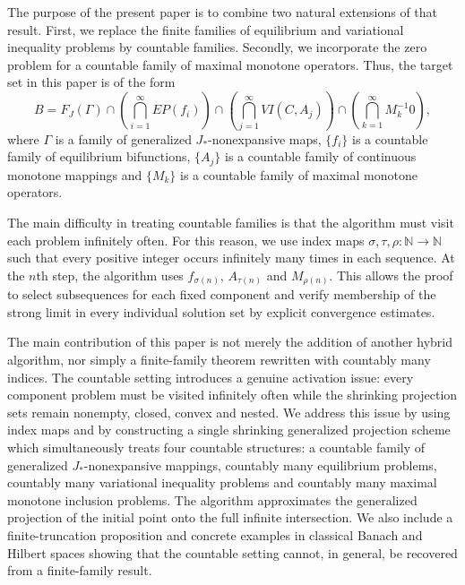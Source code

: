 \documentclass[10pt,a4paper]{amsart}
\numberwithin{equation}{section}
\begin{document}
The purpose of the present paper is to combine two natural extensions of that result. First, we replace the finite families of equilibrium and variational inequality problems by countable families. Secondly, we incorporate the zero problem for a countable family of maximal monotone operators. Thus, the target set in this paper is of the form
\[
B=F_J(\Gamma)\cap\left(\bigcap_{i=1}^{\infty}EP(f_i)\right)
\cap\left(\bigcap_{j=1}^{\infty}VI(C,A_j)\right)
\cap\left(\bigcap_{k=1}^{\infty}M_k^{-1}0\right),
\]
where $\Gamma$ is a family of generalized $J_{*}$-nonexpansive maps, $\{f_i\}$ is a countable family of equilibrium bifunctions, $\{A_j\}$ is a countable family of continuous monotone mappings and $\{M_k\}$ is a countable family of maximal monotone operators.

The main difficulty in treating countable families is that the algorithm must visit each problem infinitely often. For this reason, we use index maps $\sigma,\tau,\rho:\mathbb{N}\to\mathbb{N}$ such that every positive integer occurs infinitely many times in each sequence. At the $n$th step, the algorithm uses $f_{\sigma(n)}$, $A_{\tau(n)}$ and $M_{\rho(n)}$. This allows the proof to select subsequences for each fixed component and verify membership of the strong limit in every individual solution set by explicit convergence estimates.

The main contribution of this paper is not merely the addition of another hybrid algorithm, nor simply a finite-family theorem rewritten with countably many indices. The countable setting introduces a genuine activation issue: every component problem must be visited infinitely often while the shrinking projection sets remain nonempty, closed, convex and nested. We address this issue by using index maps and by constructing a single shrinking generalized projection scheme which simultaneously treats four countable structures: a countable family of generalized $J_{*}$-nonexpansive mappings, countably many equilibrium problems, countably many variational inequality problems and countably many maximal monotone inclusion problems. The algorithm approximates the generalized projection of the initial point onto the full infinite intersection. We also include a finite-truncation proposition and concrete examples in classical Banach and Hilbert spaces showing that the countable setting cannot, in general, be recovered from a finite-family result.
\end{document}
